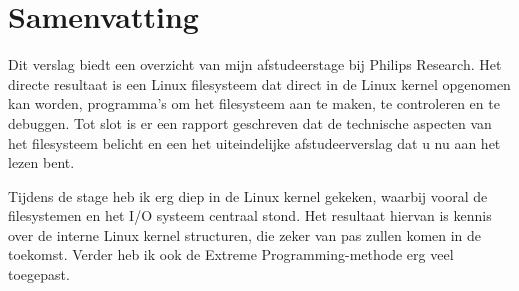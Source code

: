 \chapter{Samenvatting}

Dit verslag biedt een overzicht van mijn afstudeerstage bij Philips Research. Het directe resultaat is een Linux filesysteem dat direct in de Linux kernel opgenomen kan worden, programma's om het filesysteem aan te maken, te controleren en te debuggen. Tot slot is er een rapport geschreven dat de technische aspecten van het filesysteem belicht en een het uiteindelijke afstudeerverslag dat u nu aan het lezen bent.

Tijdens de stage heb ik erg diep in de Linux kernel gekeken, waarbij vooral de filesystemen en het I/O systeem centraal stond. Het resultaat hiervan is kennis over de interne Linux kernel structuren, die zeker van pas zullen komen in de toekomst. Verder heb ik ook de Extreme Programming-methode erg veel toegepast.
